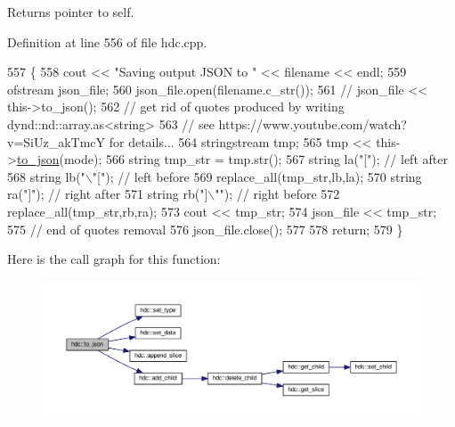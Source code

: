 Returns pointer to self. 



Definition at line 556 of file hdc.\+cpp.


\begin{DoxyCode}
557 \{
558     cout << \textcolor{stringliteral}{"Saving output JSON to "} << filename << endl;
559     ofstream json\_file;
560     json\_file.open(filename.c\_str());
561     \textcolor{comment}{// json\_file << this->to\_json();}
562     \textcolor{comment}{// get rid of quotes produced by writing dynd::nd::array.as<string>}
563     \textcolor{comment}{// see https://www.youtube.com/watch?v=SiUz\_akTmcY for details...}
564     stringstream tmp;
565     tmp << this->\hyperlink{a00003_af7684e94ec717ae6e9de1ba1f0e6bff0}{to\_json}(mode);
566     \textcolor{keywordtype}{string} tmp\_str = tmp.str();
567     \textcolor{keywordtype}{string} la(\textcolor{stringliteral}{"["}); \textcolor{comment}{// left after}
568     \textcolor{keywordtype}{string} lb(\textcolor{stringliteral}{"\(\backslash\)"["}); \textcolor{comment}{// left before}
569     replace\_all(tmp\_str,lb,la);
570     \textcolor{keywordtype}{string} ra(\textcolor{stringliteral}{"]"}); \textcolor{comment}{// right after}
571     \textcolor{keywordtype}{string} rb(\textcolor{stringliteral}{"]\(\backslash\)""}); \textcolor{comment}{// right before}
572     replace\_all(tmp\_str,rb,ra);
573     cout << tmp\_str;
574     json\_file << tmp\_str;
575     \textcolor{comment}{// end of quotes removal}
576     json\_file.close();
577 
578     \textcolor{keywordflow}{return};
579 \}
\end{DoxyCode}


Here is the call graph for this function\+:
\nopagebreak
\begin{figure}[H]
\begin{center}
\leavevmode
\includegraphics[width=350pt]{a00003_af7684e94ec717ae6e9de1ba1f0e6bff0_cgraph}
\end{center}
\end{figure}


